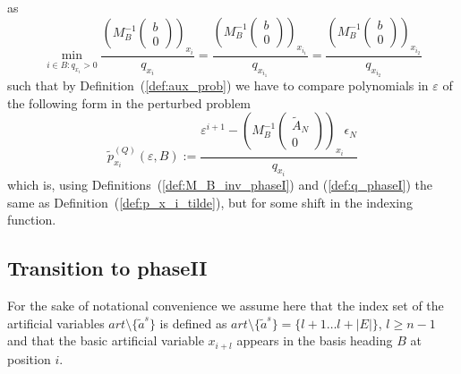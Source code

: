 \documentclass[a4paper]{article}
\begin{document}
as
\begin{equation*}
\min_{i \in B: q_{x_{i}}>0}
\frac{
\left(M_{B}^{-1}
  \left(\begin{array}{c}
          b \\
	  \hline
	  0
        \end{array}
  \right)
\right)_{x_{i}}
}{q_{x_{i}}}
=
\frac{
\left(M_{B}^{-1}
  \left(\begin{array}{c}
          b \\
	  \hline
	  0
        \end{array}
  \right)
\right)_{x_{i_{1}}}
}{q_{x_{i_{1}}}}
=
\frac{
\left(M_{B}^{-1}
  \left(\begin{array}{c}
          b \\
	  \hline
	  0
        \end{array}
  \right)
\right)_{x_{i_{2}}}
}{q_{x_{i_{2}}}}
\end{equation*}
such that by Definition~(\ref{def:aux_prob}) we have to compare polynomials
in $\varepsilon$ of the following form in the perturbed problem
\begin{equation}
\label{def:p_x_i_tilde_Q_1}
\tilde{p}_{x_{i}}^{(Q)}\left(\varepsilon, B\right) :=
\frac{
 \varepsilon^{i+1}
 -\left(M_{B}^{-1}
   \left(\begin{array}{c}
           \tilde{A}_{N} \\
	   \hline
	    0
         \end{array}
   \right)
  \right)_{x_{i}}
 \epsilon_{N}
}{q_{x_{i}}}
\end{equation}
which is, using Definitions~(\ref{def:M_B_inv_phaseI}) and
(\ref{def:q_phaseI}) the same as
Definition~(\ref{def:p_x_i_tilde}),
but for some shift in the indexing function.

 
\subsection{Transition to phaseII}
For the sake of notational convenience we assume here that the index set of the
artificial variables $art\setminus \{\tilde{a}^{s}\}$ is defined as
$art\setminus \{\tilde{a}^{s}\}=\{l+1 \ldots l+\left|E\right| \}$,
$l \geq n-1$ and that the basic artificial variable $x_{i+l}$ appears in the
basis heading $B$ at position $i$.
\end{document}
